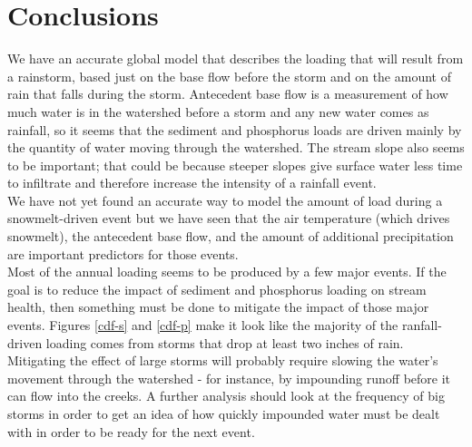 \documentclass[10pt]{article}
\begin{document}
\section{Conclusions}
We have an accurate global model that describes the loading that will result from a rainstorm, based just on the base flow before the storm and on the amount of rain that falls during the storm. Antecedent base flow is a measurement of how much water is in the watershed before a storm and any new water comes as rainfall, so it seems that the sediment and phosphorus loads are driven mainly by the quantity of water moving through the watershed. The stream slope also seems to be important; that could be because steeper slopes give surface water less time to infiltrate and therefore increase the intensity of a rainfall event.\\

We have not yet found an accurate way to model the amount of load during a snowmelt-driven event but we have seen that the air temperature (which drives snowmelt), the antecedent base flow, and the amount of additional precipitation are important predictors for those events.\\

Most of the annual loading seems to be produced by a few major events. If the goal is to reduce the impact of sediment and phosphorus loading on stream health, then something must be done to mitigate the impact of those major events. Figures \ref{cdf-s} and \ref{cdf-p} make it look like the majority of the ranfall-driven loading comes from storms that drop at least two inches of rain. Mitigating the effect of large storms will probably require slowing the water's movement through the watershed - for instance, by impounding runoff before it can flow into the creeks. A further analysis should look at the frequency of big storms in order to get an idea of how quickly impounded water must be dealt with in order to be ready for the next event.\\
\end{document}
